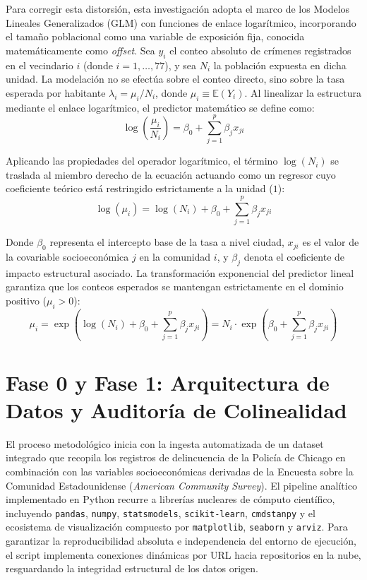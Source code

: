 \documentclass[11pt,a4paper]{article}
\begin{document}
Para corregir esta distorsión, esta investigación adopta el marco de los Modelos Lineales Generalizados (GLM) con funciones de enlace logarítmico, incorporando el tamaño poblacional como una variable de exposición fija, conocida matemáticamente como \textit{offset}. Sea $y_i$ el conteo absoluto de crímenes registrados en el vecindario $i$ (donde $i = 1, \dots, 77$), y sea $N_i$ la población expuesta en dicha unidad. La modelación no se efectúa sobre el conteo directo, sino sobre la tasa esperada por habitante $\lambda_i = \mu_i / N_i$, donde $\mu_i \equiv \mathbb{E}(Y_i)$. Al linealizar la estructura mediante el enlace logarítmico, el predictor matemático se define como:
\begin{equation}
    \log\left(\frac{\mu_i}{N_i}\right) = \beta_0 + \sum_{j=1}^{p} \beta_j x_{ji}
\end{equation}

Aplicando las propiedades del operador logarítmico, el término $\log(N_i)$ se traslada al miembro derecho de la ecuación actuando como un regresor cuyo coeficiente teórico está restringido estrictamente a la unidad ($1$):
\begin{equation}
    \log(\mu_i) = \log(N_i) + \beta_0 + \sum_{j=1}^{p} \beta_j x_{ji}
\end{equation}

Donde $\beta_0$ representa el intercepto base de la tasa a nivel ciudad, $x_{ji}$ es el valor de la covariable socioeconómica $j$ en la comunidad $i$, y $\beta_j$ denota el coeficiente de impacto estructural asociado. La transformación exponencial del predictor lineal garantiza que los conteos esperados se mantengan estrictamente en el dominio positivo ($\mu_i > 0$):
\begin{equation}
    \mu_i = \exp\left(\log(N_i) + \beta_0 + \sum_{j=1}^{p} \beta_j x_{ji}\right) = N_i \cdot \exp\left(\beta_0 + \sum_{j=1}^{p} \beta_j x_{ji}\right)
\end{equation}

\section{Fase 0 y Fase 1: Arquitectura de Datos y Auditoría de Colinealidad}
El proceso metodológico inicia con la ingesta automatizada de un dataset integrado que recopila los registros de delincuencia de la Policía de Chicago en combinación con las variables socioeconómicas derivadas de la Encuesta sobre la Comunidad Estadounidense (\textit{American Community Survey}). El pipeline analítico implementado en Python recurre a librerías nucleares de cómputo científico, incluyendo \texttt{pandas}, \texttt{numpy}, \texttt{statsmodels}, \texttt{scikit-learn}, \texttt{cmdstanpy} y el ecosistema de visualización compuesto por \texttt{matplotlib}, \texttt{seaborn} y \texttt{arviz}. Para garantizar la reproducibilidad absoluta e independencia del entorno de ejecución, el script implementa conexiones dinámicas por URL hacia repositorios en la nube, resguardando la integridad estructural de los datos origen.
\end{document}
